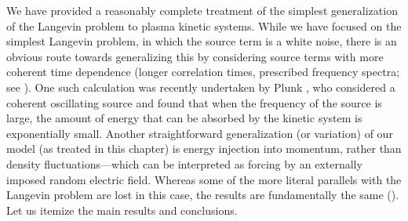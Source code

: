 We have provided a reasonably complete treatment 
of the simplest generalization of the Langevin problem to plasma kinetic 
systems. While we have focused on the simplest Langevin problem, in which the 
source term is a white noise, there is an obvious route towards generalizing 
this by considering source terms with more coherent time dependence 
(longer correlation times, prescribed frequency spectra; see \cite{plunk13}). 
One such calculation was recently undertaken by Plunk \cite{plunk14}, who 
considered a coherent oscillating source and found
that when the frequency of the source is large, the amount of energy that 
can be absorbed by the kinetic system is exponentially small. 
Another straightforward generalization (or variation) of our model
(as treated in this chapter) 
is energy injection into momentum, rather than density fluctuations---which can 
be interpreted as forcing by an externally imposed random electric field.
Whereas some of the more literal parallels with the Langevin problem 
are lost in this case, the results are fundamentally the same ().
Let us itemize the main results and conclusions.\\ 

